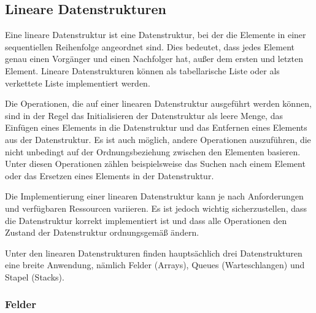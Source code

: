 \subsection{Lineare Datenstrukturen}
Eine lineare Datenstruktur ist eine Datenstruktur, bei der die Elemente in einer sequentiellen Reihenfolge angeordnet sind. Dies bedeutet, dass jedes Element genau einen Vorgänger und einen Nachfolger hat, außer dem ersten und letzten Element. Lineare Datenstrukturen können als tabellarische Liste oder als verkettete Liste implementiert werden. \autocite[314-315]{hoffmann_einfuhrung_2011}

Die Operationen, die auf einer linearen Datenstruktur ausgeführt werden können, sind in der Regel das Initialisieren der Datenstruktur als leere Menge, das Einfügen eines Elements in die Datenstruktur und das Entfernen eines Elements aus der Datenstruktur. Es ist auch möglich, andere Operationen auszuführen, die nicht unbedingt auf der Ordnungsbeziehung zwischen den Elementen basieren. Unter diesen Operationen zählen beispielsweise das Suchen nach einem Element oder das Ersetzen eines Elements in der Datenstruktur. \autocite[314-315]{hoffmann_einfuhrung_2011}

Die Implementierung einer linearen Datenstruktur kann je nach Anforderungen und verfügbaren Ressourcen variieren. Es ist jedoch wichtig sicherzustellen, dass die Datenstruktur korrekt implementiert ist und dass alle Operationen den Zustand der Datenstruktur ordnungsgemäß ändern. \autocite[314-315]{hoffmann_einfuhrung_2011}

Unter den linearen Datenstrukturen finden hauptsächlich drei Datenstrukturen eine breite Anwendung, nämlich Felder (Arrays), Queues (Warteschlangen) und Stapel (Stacks).

\subsubsection{Felder}

